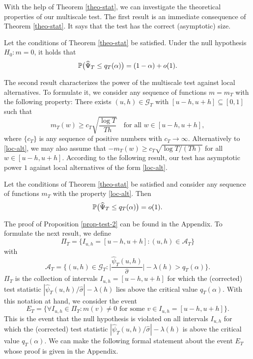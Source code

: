 With the help of Theorem \ref{theo-stat}, we can investigate the theoretical properties of our multiscale test. The first result is an immediate consequence of Theorem \ref{theo-stat}. It says that the test has the correct (asymptotic) size. 
\begin{prop}\label{prop-test-1}
Let the conditions of Theorem \ref{theo-stat} be satisfied. Under the null hypothesis $H_0: m = 0$, it holds that 
\[ \mathbb{P} \big( \widehat{\Psi}_T \le q_T(\alpha) \big) = (1 - \alpha) + o(1). \]
\end{prop}
The second result characterizes the power of the multiscale test against local alternatives. To formulate it, we consider any sequence of functions $m = m_T$ with the following property: There exists $(u,h) \in \mathcal{G}_T$ with $[u-h,u+h] \subseteq [0,1]$ such that 
\begin{equation}\label{loc-alt}
m_T(w) \ge c_T \sqrt{\frac{\log T}{Th}} \quad \text{for all } w \in [u-h,u+h], 
\end{equation}
where $\{c_T\}$ is any sequence of positive numbers with $c_T \rightarrow \infty$. Alternatively to \eqref{loc-alt}, we may also assume that $-m_T(w) \ge c_T \sqrt{\log T/(Th)}$ for all $w \in [u-h,u+h]$. According to the following result, our test has asymptotic power $1$ against local alternatives of the form \eqref{loc-alt}. 
\begin{prop}\label{prop-test-2}
Let the conditions of Theorem \ref{theo-stat} be satisfied and consider any sequence of functions $m_T$ with the property \eqref{loc-alt}. Then 
\[ \mathbb{P} \big( \widehat{\Psi}_T \le q_T(\alpha) \big) = o(1). \]
\end{prop}
The proof of Proposition \ref{prop-test-2} can be found in the Appendix. To formulate the next result, we define 
\[ \Pi_T = \big\{ I_{u,h} = [u-h,u+h]: (u,h) \in \mathcal{A}_T \big\} \]
with 
\[ \mathcal{A}_T = \Big\{ (u,h) \in \mathcal{G}_T: \Big|\frac{\widehat{\psi}_T(u,h)}{\widehat{\sigma}}\Big| - \lambda(h) > q_T(\alpha) \Big\}. \]
$\Pi_T$ is the collection of intervals $I_{u,h} = [u-h,u+h]$ for which the (corrected) test statistic $|\widehat{\psi}_T(u,h)/\widehat{\sigma}| - \lambda(h)$ lies above the critical value $q_T(\alpha)$. With this notation at hand, we consider the event 
\[ E_T = \Big\{ \forall I_{u,h} \in \Pi_T: m(v) \ne 0 \text{ for some } v \in I_{u,h} = [u-h,u+h] \Big\}. \]
This is the event that the null hypothesis is violated on all intervals $I_{u,h}$ for which the (corrected) test statistic $|\widehat{\psi}_T(u,h)/\widehat{\sigma}| - \lambda(h)$ is above the critical value $q_T(\alpha)$. We can make the following formal statement about the event $E_T$ whose proof is given in the Appendix. 
